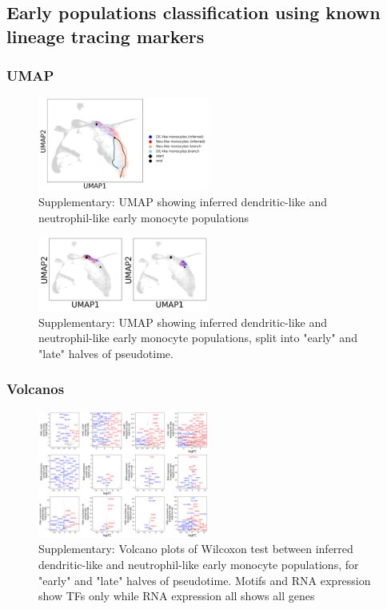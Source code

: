 \documentclass[a4paper]{article}
\begin{document}
\FloatBarrier
\subsection{Early populations classification using known lineage tracing markers}

\subsubsection{UMAP}
\begin{figure}[!htb]
  \centering
  \includegraphics[width=0.5\textwidth]{../figures/hematopoiesis/markers_early_groups_umap.png}
  \caption{Supplementary: UMAP showing inferred dendritic-like and neutrophil-like early monocyte populations }
\end{figure}

\begin{figure}[!htb]
  \centering
  \includegraphics[width=0.5\textwidth]{../figures/hematopoiesis/markers_early_groups_umap_split.png}
  \caption{Supplementary: UMAP showing inferred dendritic-like and neutrophil-like early monocyte populations, split into "early" and "late" halves of pseudotime. }
\end{figure}

\FloatBarrier
\subsubsection{Volcanos}

\begin{figure}[!htb]
  \centering
  \includegraphics[width=0.5\textwidth]{../figures/hematopoiesis/markers_early_groups_detailed_assays.png}
  \caption{Supplementary: Volcano plots of Wilcoxon test between inferred dendritic-like and neutrophil-like early monocyte populations, for "early" and "late" halves of pseudotime. Motifs and RNA expression show TFs only while RNA expression all shows all genes}
\end{figure}
\end{document}
